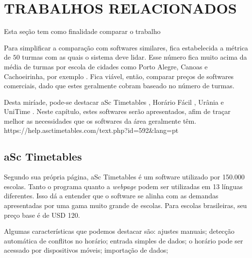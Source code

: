 \documentclass[12pt,a4paper]{article}
\begin{document}
	\section{TRABALHOS RELACIONADOS}

		Esta seção tem como finalidade comparar o trabalho

		\par Para simplificar a comparação com softwares similares, fica estabelecida a métrica de $50$ turmas com as quais o sistema deve lidar. Esse número fica muito acima da média de turmas por escola de cidades como Porto Alegre, Canoas e Cachoeirinha, por exemplo \cite{inep}. Fica viável, então, comparar preços de softwares comerciais, dado que estes geralmente cobram baseado no número de turmas.

		\par Desta miríade, pode-se destacar aSc Timetables \cite{rel_asctimetables}, Horário Fácil \cite{rel_horariofacil}, Urânia \cite{rel_urania} e UniTime \cite{rel_unitime}. Neste capítulo, estes softwares serão apresentados, afim de traçar melhor as necessidades que os softwares da área geralmente têm. https://help.asctimetables.com/text.php?id=592\&lang=pt

		\subsection{aSc Timetables}

			\par Segundo sua própria página, aSc Timetables é um software utilizado por 150.000 escolas. Tanto o programa quanto a \textit{webpage} podem ser utilizadas em 13 línguas diferentes. Isso dá a entender que o software se alinha com as demandas apresentadas por uma gama muito grande de escolas. Para escolas brasileiras, seu preço base é de USD 120.

			\par Algumas características que podemos destacar são: ajustes manuais; detecção automática de conflitos no horário; entrada simples de dados;  o horário pode ser acessado por dispositivos móveis; importação de dados;
\end{document}
